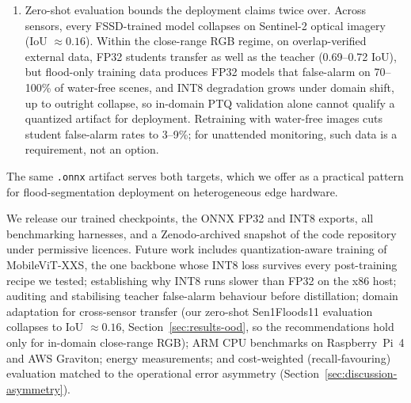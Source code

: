 \begin{enumerate}
\item Zero-shot evaluation bounds the deployment claims twice over. Across sensors, every FSSD-trained model collapses on Sentinel-2 optical imagery (IoU $\approx 0.16$). Within the close-range RGB regime, on overlap-verified external data, FP32 students transfer as well as the teacher (0.69--0.72 IoU), but flood-only training data produces FP32 models that false-alarm on 70--100\% of water-free scenes, and INT8 degradation grows under domain shift, up to outright collapse, so in-domain PTQ validation alone cannot qualify a quantized artifact for deployment. Retraining with water-free images cuts student false-alarm rates to 3--9\%; for unattended monitoring, such data is a requirement, not an option.
\end{enumerate}

The same \texttt{.onnx} artifact serves both targets, which we offer as a practical pattern for flood-segmentation deployment on heterogeneous edge hardware.

We release our trained checkpoints, the ONNX FP32 and INT8 exports, all benchmarking harnesses, and a Zenodo-archived snapshot of the code repository under permissive licences. Future work includes quantization-aware training of MobileViT-XXS, the one backbone whose INT8 loss survives every post-training recipe we tested; establishing why INT8 runs slower than FP32 on the x86 host; auditing and stabilising teacher false-alarm behaviour before distillation; domain adaptation for cross-sensor transfer (our zero-shot Sen1Floods11 evaluation collapses to IoU $\approx 0.16$, Section~\ref{sec:results-ood}, so the recommendations hold only for in-domain close-range RGB); ARM CPU benchmarks on Raspberry~Pi~4 and AWS Graviton; energy measurements; and cost-weighted (recall-favouring) evaluation matched to the operational error asymmetry (Section~\ref{sec:discussion-asymmetry}).
